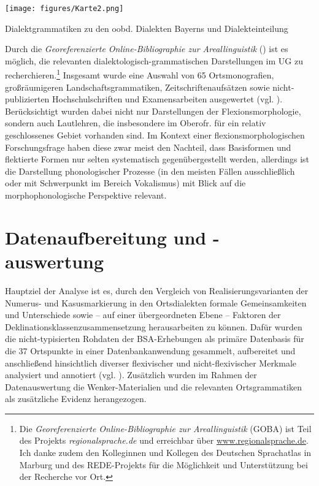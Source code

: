 \begin{map}
\texttt{[image: figures/Karte2.png]}
\caption{Dialektgrammatiken zu den oobd. Dialekten Bayerns und  Dialekteinteilung}
\label{map:2}
\end{map}

Durch die \textit{Georeferenzierte Online-Bibliographie zur Areallinguistik} (\citealt{SchmidtEtAl2008ff}) ist es möglich, die relevanten dialektologisch-grammatischen Darstellungen im UG zu recherchieren.\footnote{Die \textit{Georeferenzierte Online-Bibliographie zur Areallinguistik} (GOBA) ist Teil des Projekts \textit{regionalsprache.de} und erreichbar über \url{www.regionalsprache.de}. Ich danke zudem den Kolleginnen und Kollegen des Deutschen Sprachatlas in Marburg und des REDE-Projekts für die Möglichkeit und Unterstützung bei der Recherche vor Ort.} Insgesamt wurde eine Auswahl von 65 Ortsmonografien, großräumigeren Landschaftsgrammatiken, Zeitschriftenaufsätzen sowie nicht-publizierten Hochschulschriften und Examensarbeiten ausgewertet (vgl. ). Berücksichtigt wurden dabei nicht nur Darstellungen der Flexionsmorphologie, sondern auch Lautlehren, die insbesondere im Oberofr. für ein relativ geschlossenes Gebiet vorhanden sind. Im Kontext einer flexionsmorphologischen Forschungsfrage haben diese zwar meist den Nachteil, dass Basisformen und flektierte Formen nur selten systematisch gegenübergestellt werden, allerdings ist die Darstellung phonologischer Prozesse (in den meisten Fällen ausschließlich oder mit Schwerpunkt im Bereich Vokalismus) mit Blick auf die morphophonologische Perspektive relevant.

\section{Datenaufbereitung und -auswertung}
\label{sec:6.3}
Hauptziel der Analyse ist es, durch den Vergleich von Realisierungsvarianten der Numerus- und Kasusmarkierung in den Ortsdialekten formale Gemeinsamkeiten und Unterschiede sowie -- auf einer übergeordneten Ebene -- Faktoren der Deklinationsklassenzusammensetzung herausarbeiten zu können. Dafür wurden die nicht-typisierten Rohdaten der BSA-Erhebungen als primäre Datenbasis für die 37 Ortspunkte in einer Datenbankanwendung gesammelt, aufbereitet und anschließend hinsichtlich diverser flexivischer und nicht-flexivischer Merkmale analysiert und annotiert (vgl. ). Zusätzlich wurden im Rahmen der Datenauswertung die Wenker-Materialien und die relevanten Ortsgrammatiken als zusätzliche Evidenz herangezogen.

